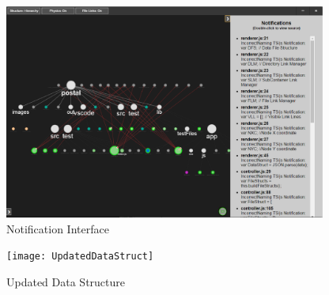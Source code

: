 \documentclass[letterpaper,10pt,titlepage,draftclsnofoot,onecolumn,onesided] {IEEEtran}
\begin{document}
	\begin{figure}[H]
		\includegraphics[width=400px]{PostalNotification}
		\caption{Notification Interface}  
	\end{figure}
	
	\begin{figure}[H]
		\texttt{[image: UpdatedDataStruct]}
		\caption{Updated Data Structure}
	\end{figure}
	
\pagebreak


\end{document}
